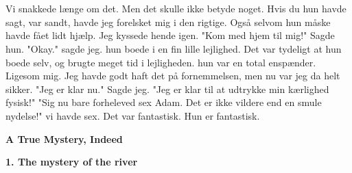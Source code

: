 \documentclass[]{article}
\begin{document}
\\ \\
Vi snakkede længe om det. Men det skulle ikke betyde noget. Hvis du hun havde sagt, var sandt, havde jeg forelsket mig i den rigtige. Også selvom hun måske havde fået lidt hjælp. Jeg kyssede hende igen. "Kom med hjem til mig!" Sagde hun. "Okay." sagde jeg. hun boede i en fin lille lejlighed. Det var tydeligt at hun boede selv, og brugte meget tid i lejligheden. hun var en total enspænder. Ligesom mig. Jeg havde godt haft det på fornemmelsen, men nu var jeg da helt sikker. "Jeg er klar nu." Sagde jeg. "Jeg er klar til at udtrykke min kærlighed fysisk!" "Sig nu bare forheleved sex Adam. Det er ikke vildere end en smule nydelse!" vi havde sex. Det var fantastisk. Hun er fantastisk.

\newpage

\begin{center}
	\Large\textbf{A True Mystery, Indeed}
\end{center}

\begin{center}
	\large\textbf{1. The mystery of the river}
\end{center}
\end{document}
